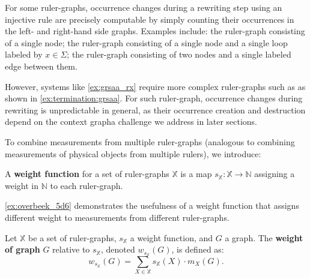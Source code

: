 For some ruler-graphs, occurrence changes during a rewriting step using an injective rule are precisely computable by simply counting their occurrences in the left- and right-hand side graphs. Examples include: the ruler-graph  consisting of a single node; the ruler-graph  consisting of a single node and a single loop labeled by $x\in \Sigma$; the ruler-graph  consisting of two nodes and a single labeled edge between them.  
    
However, systems like \autoref{ex:grsaa_rx} require more complex ruler-graphs such as  as shown in \autoref{ex:termination:grsaa}.
    For such ruler-graph, occurrence changes during rewriting is unpredictable in general, as their occurrence creation and destruction depend on the context graph\textemdash a challenge we address in later sections.
    
To combine measurements from multiple ruler-graphs (analogous to combining measurements of physical objects from multiple rulers), we introduce:
\begin{definition}
    \label{def:weight_function}
    A \textbf{weight function} for a set of ruler-graphs \( \mathbb{X} \) is a map \( s_{\mathbb{X}} \colon \mathbb{X} \to \mathbb{N} \) assigning a weight in $\mathbb{N}$ to each ruler-graph.
\end{definition}
\autoref{ex:overbeek_5d6} demonstrates the usefulness of a weight function that assigns different weight to measurements from different ruler-graphs.
\begin{definition}
    \label{def:graph_weight}  
    Let \( \mathbb{X} \) be a set of ruler-graphs, 
    \( s_{\mathbb{X}} \) a weight function, and \( G \) a graph. The \textbf{weight of graph} \( G \) relative to \( s_{\mathbb{X}} \), denoted \( w_{s_{\mathbb{X}}}(G) \), is defined as: 
    \[
        w_{s_{\mathbb{X}}}(G) = \sum_{X \in \mathbb{X}} s_{\mathbb{X}}(X) \cdot m_X(G).  
    \]  
\end{definition}



